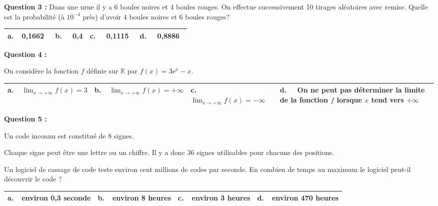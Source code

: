 \documentclass[10pt]{article}
\providecommand{\R}{\mathbb{R}}
\providecommand{\e}{{\mathrm{e}}}
\providecommand{\np}[2][]{{#2~#1}}
\begin{document}
\textbf{Question 3 :}
Dans une urne il y a 6 boules noires et 4 boules rouges. On effectue successivement 10 tirages aléatoires avec remise. Quelle est la probabilité (à $10^{-4}$ près) d'avoir 4 boules noires et 6 boules rouges?

\begin{center}
\begin{tabularx}{\linewidth}{|*{4}{X|}}\hline
\textbf{a.~~}\np{0,1662}&\textbf{b.~~} 0,4&\textbf{c.~~} \np{0,1115}&\textbf{d.~~} \np{0,8886}\\ \hline
\end{tabularx}
\end{center}

\medskip

\textbf{Question 4 :}

On considère la fonction $f$ définie sur $\R$ par $f(x) = 3\e^x - x$.

\begin{center}
\begin{tabularx}{\linewidth}{|*{4}{>{\small}X|}}\hline
\textbf{a.~~}$\displaystyle\lim_{x \to + \infty} f(x) = 3$
&\textbf{b.~~}$\displaystyle\lim_{x \to + \infty} f(x) = +\infty $&\textbf{c.~~} $\displaystyle\lim_{x \to + \infty} f(x) =  -\infty$&\textbf{d.~~} On ne peut pas déterminer la limite de la fonction $f$ lorsque $x$ tend vers $+\infty$\\ \hline
\end{tabularx}
\end{center}

\medskip

\textbf{Question 5 :}

Un code inconnu est constitué de 8 signes. 

Chaque signe peut être une lettre ou un chiffre. Il y a
donc 36 signes utilisables pour chacune des positions.

Un logiciel de cassage de code teste environ cent millions de codes par seconde. En combien de temps au maximum le logiciel peut-il découvrir le code ?

\begin{center}
\begin{tabularx}{\linewidth}{|*{4}{X|}}\hline
\textbf{a.~~}environ 0,3 seconde&\textbf{b.~~}environ 8 heures&\textbf{c.~~}environ 3 heures&
\textbf{d.~~}environ 470 heures\\ \hline
\end{tabularx}
\end{center}

\bigskip
\end{document}
